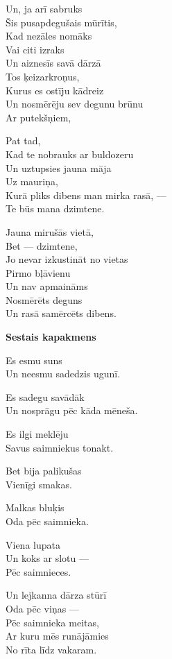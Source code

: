\documentclass[14pt]{extarticle}
\begin{document}
Un, ja arī sabruks\\
Šis pusapdegušais mūrītis,\\
Kad nezāles nomāks\\
Vai citi izraks\\
Un aiznesīs savā dārzā\\
Tos ķeizarkroņus,\\
Kurus es ostīju kādreiz\\
Un nosmērēju sev degunu brūnu\\
Ar putekšņiem,

Pat tad,\\
Kad te nobrauks ar buldozeru\\
Un uztupsies jauna māja\\
Uz mauriņa,\\
Kurā pliks dibens man mirka rasā, ---\\
Te būs mana dzimtene.

Jauna mirušās vietā,\\
Bet --- dzimtene,\\
Jo nevar izkustināt no vietas\\
Pirmo bļāvienu\\
Un nav apmaināms\\
Nosmērēts deguns\\
Un rasā samērcēts dibens.


\newpage

{\bf Sestais kapakmens}

Es esmu suns\\
Un neesmu sadedzis ugunī.

Es sadegu savādāk\\
Un nosprāgu pēc kāda mēneša.

Es ilgi meklēju\\
Savus saimniekus tonakt.

Bet bija palikušas\\
Vienīgi smakas.

Malkas bluķis\\
Oda pēc saimnieka.

Viena lupata\\
Un koks ar slotu ---\\
Pēc saimnieces.

Un lejkanna dārza stūrī\\
Oda pēc viņas ---\\
Pēc saimnieka meitas,\\
Ar kuru mēs runājāmies\\
No rīta līdz vakaram.
\end{document}
